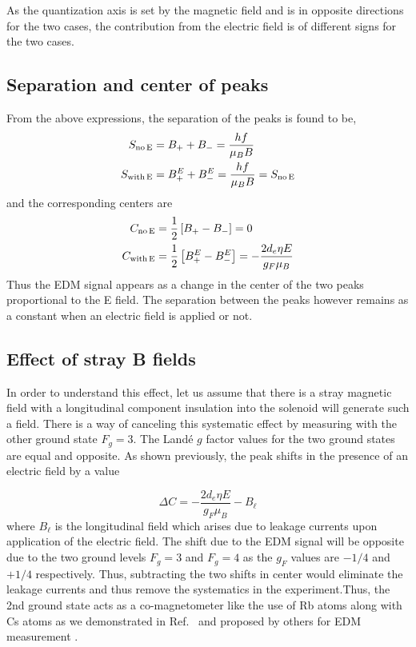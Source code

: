 As the quantization axis is set by the magnetic field and is in opposite directions for the two cases, the contribution from the electric field is of different signs for the two cases.

\subsection{Separation and center of peaks}

From the above expressions, the separation of the peaks is found to be,
\begin{equation}
\begin{aligned}
S_{\rm no \, E} &= B_+ + B_- = \frac{hf}{\mu_B B} \\
S_{\rm with \, E} &= B_+^E + B_-^E = \frac{hf}{\mu_B B} = S_{\rm no \, E}
\end{aligned}
\end{equation}
and the corresponding centers are 
\begin{equation*}
\begin{aligned}
C_{\rm no \, E} &= \dfrac{1}{2} \left[B_+ - B_-\right] = 0  \\
C_{\rm with \, E} &= \dfrac{1}{2} \left[ B_+^E - B_-^E \right] = - \dfrac{2d_e\eta E}{g_F \mu_B}
\end{aligned}
\end{equation*}
Thus the EDM signal appears as a change in the center of the two peaks proportional to the E field. The separation between the peaks however remains as a constant when an electric field is applied or not.

\subsection{Effect of stray B fields}
In order to understand this effect, let us assume that there is a stray magnetic field with a longitudinal component insulation into the solenoid will generate such a field. There is a way of canceling this systematic effect by measuring with the other ground state $F_g=3$. The Land\'e $g$ factor values for the two ground states are equal and opposite. As shown previously, the peak shifts in the presence of an electric field by a value

\begin{equation*}
\Delta C = - \dfrac{2 d_e \eta E}{g_F \mu_B} - B_\ell
\end{equation*}
where $B_\ell$ is the longitudinal field which arises due to leakage currents upon application of the electric field. The shift due to the EDM signal will be opposite due to the two ground levels $F_g=3$ and $F_g=4$ as the $ g_F $ values are $-1/4$ and $+1/4$ respectively. Thus, subtracting the two shifts in center would eliminate the leakage currents and thus remove the systematics in the experiment.Thus, the 2nd ground state acts as a co-magnetometer like the use of Rb atoms along with Cs atoms as we demonstrated in Ref.\ \cite{RCN11} and proposed by others for EDM measurement \cite{CLV01}.

